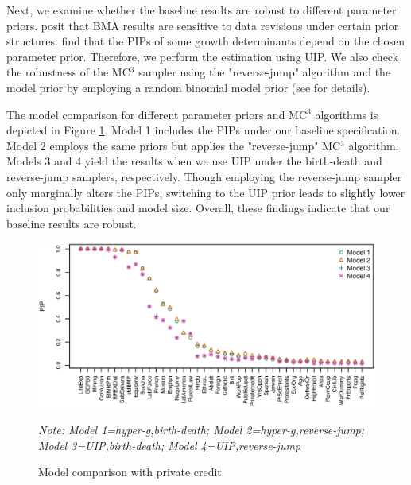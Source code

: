 \begin{refsection}
Next, we examine whether the baseline results are robust to different parameter priors. \textcite{CicconeJarocinski2010} posit that \ac{BMA} results are sensitive to data revisions under certain prior structures. \textcite{Eicheretal2011} find that the \acp{PIP} of some growth determinants depend on the chosen parameter prior. Therefore, we perform the estimation using \ac{UIP}. We also check the robustness of the MC$^{3}$ sampler using the "reverse-jump" algorithm and the model prior by employing a random binomial model prior (see \textcite{Zeugner2011} for details).

The model comparison for different parameter priors and MC$^{3}$ algorithms is depicted in Figure \ref{ch2fig:compPC}. Model 1 includes the \acp{PIP} under our baseline specification. Model 2 employs the same priors but applies the "reverse-jump" MC$^{3}$ algorithm. Models 3 and 4 yield the results when we use \ac{UIP} under the birth-death and reverse-jump samplers, respectively. Though employing the reverse-jump sampler only marginally alters the \acp{PIP}, switching to the \ac{UIP} prior leads to slightly lower inclusion probabilities and model size. Overall, these findings indicate that our baseline results are robust.

% 
\begin{figure}[!ht]
		\centering
		\caption{Model comparison with private credit}
		\label{ch2fig:compPC}
		\includegraphics[width=\linewidth]{Figures/ch2/plotCompPC6011}
	 \begin{minipage}{0.8\textwidth}
		\footnotesize
		\emph{Note: Model 1=hyper-g,birth-death; Model 2=hyper-g,reverse-jump; Model 3=\ac{UIP},birth-death; Model 4=\ac{UIP},reverse-jump}
	  \end{minipage}
\end{figure}
%


\end{refsection}
